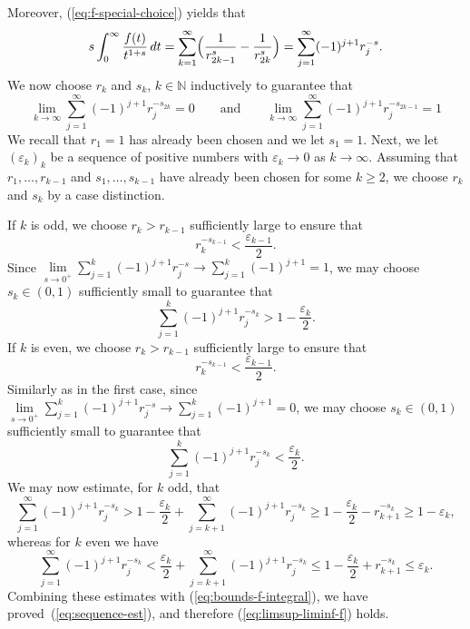 \documentclass[notitlepage,11pt,reqno]{amsart}
\theoremstyle{definition}
\numberwithin{equation}{section}
\newcommand{\eps}{{\varepsilon}}
\newcommand{\N}{\mathds{N}}
\begin{document}
Moreover, (\ref{eq:f-special-choice}) yields that 
$$
s \int_0^{\infty}\frac{f(t)}{t^{1+s}}\, dt = \sum_{k=1}^\infty\Bigl(\frac{1}{r_{2k-1}^s}- \frac{1}{r_{2k}^s}\Bigr)= \sum_{j=1}^\infty (-1)^{j+1} r_j^{-s}.
$$
We now choose $r_k$ and $s_k$, $k \in \N$ inductively to guarantee that  
\begin{equation}
  \label{eq:sequence-est}
\lim_{k \to \infty} \sum_{j=1}^\infty (-1)^{j+1} r_j^{-s_{2k}}= 0 \qquad \text{and}\qquad \lim_{k \to \infty} \sum_{j=1}^\infty (-1)^{j+1} r_j^{-s_{2k-1}}= 1
\end{equation}
We recall that $r_1 = 1$ has already been chosen and we let $s_1=1$. Next, we let $(\eps_k)_k$ be a sequence of positive numbers with $\eps_k \to 0$ as $k \to \infty$. Assuming that $r_1,\dots,r_{k-1}$ and $s_1,\dots,s_{k-1}$ have already been chosen for some $k \ge 2$, we choose $r_k$ and $s_k$ by a case distinction.

If $k$ is odd, we choose $r_k> r_{k-1}$ sufficiently large to ensure that
$$
r_{k}^{-s_{k-1}}< \frac{\eps_{k-1}}{2}.
$$
Since $\lim \limits_{s \to 0^+}\sum\limits_{j=1}^{k}(-1)^{j+1} r_j^{-s} \to \sum\limits_{j=1}^{k}(-1)^{j+1} = 1$, we may choose $s_k \in (0,1)$ sufficiently small to guarantee that
$$
\sum_{j=1}^{k}(-1)^{j+1} r_j^{-s_{k}}> 1-\frac{\eps_k}{2}. 
$$
If $k$ is even, we choose $r_k > r_{k-1}$ sufficiently large to ensure that 
$$
r_{k}^{-s_{k-1}}< \frac{\eps_{k-1}}{2}.
$$
Similarly as in the first case, since $\lim \limits_{s \to 0^+}\sum\limits_{j=1}^{k}(-1)^{j+1} r_j^{-s} \to \sum\limits_{j=1}^{k}(-1)^{j+1} = 0$, we may choose $s_k \in (0,1)$ sufficiently small to guarantee that
$$
\sum_{j=1}^{k}(-1)^{j+1} r_j^{-s_{k}}< \frac{\eps_k}{2}.
$$
We may now estimate, for $k$ odd, that
$$
\sum_{j=1}^\infty (-1)^{j+1} r_j^{-s_{k}} > 1-\frac{\eps_k}{2} + \sum_{j=k+1}^{\infty}(-1)^{j+1} r_j^{-s_{k}}
\ge 1-\frac{\eps_k}{2} - r_{k+1}^{-s_k} \ge 1 - \eps_k, 
$$
whereas for $k$ even we have 
$$
\sum_{j=1}^\infty (-1)^{j+1} r_j^{-s_{k}} < \frac{\eps_k}{2} + \sum_{j=k+1}^{\infty}(-1)^{j+1} r_j^{-s_{k}}
\le 1-\frac{\eps_k}{2} + r_{k+1}^{-s_k} \le \eps_k. 
$$
Combining these estimates with (\ref{eq:bounds-f-integral}), we have proved~(\ref{eq:sequence-est}), and therefore (\ref{eq:limsup-liminf-f}) holds. 
\end{document}
